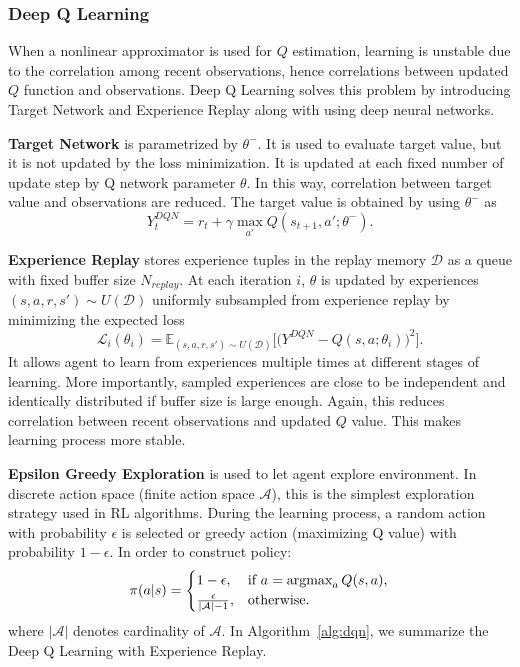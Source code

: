 \subsubsection{Deep Q Learning}
When a nonlinear approximator is used for $Q$ estimation, learning is unstable due to the correlation among recent observations, hence correlations between updated $Q$ function and observations.
Deep Q Learning solves this problem by introducing Target Network and Experience Replay \cite{mnih_human-level_2015, mnih_playing_2013} along with using deep neural networks. 

\textbf{Target Network} is parametrized by $\theta^-$. 
It is used to evaluate target value, but it is not updated by the loss minimization. 
It is updated at each fixed number of update step by Q network parameter $\theta$. 
In this way, correlation between target value and observations are reduced.
The target value is obtained by using $\theta^-$ as
\begin{equation}
\label{eqn:dqn_ntarget}
Y_t^{DQN} = r_t + \gamma \max_{a'} Q(s_{t+1},a';\theta^-).
\end{equation}

\textbf{Experience Replay} stores experience tuples in the replay memory $\mathcal{D}$ as a queue with fixed buffer size $N_{replay}$. 
At each iteration $i$, $\theta$ is updated by experiences $(s,a,r,s')\sim U(\mathcal{D})$ uniformly subsampled from experience replay by minimizing the expected loss
\begin{equation}
\label{eqn:dqn_loss}
\mathcal{L}_i(\theta_i) = \mathbb{E}_{(s,a,r,s')\sim U(\mathcal{D})}\Big[\big( Y^{DQN} - Q(s,a;\theta_i) \big) ^ 2 \Big].
\end{equation}
It allows agent to learn from experiences multiple times at different stages of learning. 
More importantly, sampled experiences are close to be independent and identically distributed if buffer size is large enough. 
Again, this reduces correlation between recent observations and updated $Q$ value. This makes learning process more stable. 

\textbf{Epsilon Greedy Exploration} is used to let agent explore environment. 
In discrete action space (finite action space $\mathcal{A}$), this is 
the simplest exploration strategy used in RL algorithms.
During the learning process, a random action with probability $\epsilon$ is selected or greedy action (maximizing Q value) with probability $1-\epsilon$. In order to construct policy:   
\begin{equation}
\label{eqn:egreedy_policy}
\pi(a|s) = 
\begin{cases}
1-\epsilon,   & \text{if } a = \operatorname{\textup{argmax}}_{a} Q(s, a), \\
\frac{\epsilon}{|\mathcal{A}|-1},     & \text{otherwise}.
\end{cases}
\end{equation}
where $|\mathcal{A}|$ denotes cardinality of $\mathcal{A}$. 
In Algorithm~\ref{alg:dqn}, we summarize the Deep Q Learning with Experience Replay. 


